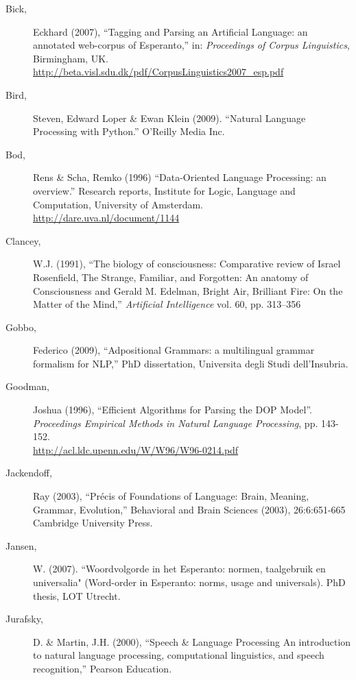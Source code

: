 \documentclass[10pt,a4paper]{article}
\begin{document}
\begin{description}
\item[Bick,] Eckhard (2007), ``Tagging and Parsing an Artificial Language: an
annotated web-corpus of Esperanto,'' in: {\em Proceedings of Corpus
Linguistics}, Birmingham, UK. \\
\url{http://beta.visl.sdu.dk/pdf/CorpusLinguistics2007_esp.pdf}

\item[Bird,] Steven, Edward Loper \& Ewan Klein (2009).
    ``Natural Language Processing with Python.''  O'Reilly Media Inc.

\item[Bod,] Rens \& Scha, Remko (1996) ``Data-Oriented Language Processing: an
overview.'' Research reports, Institute for Logic, Language and Computation,
University of Amsterdam. \\
\url{http://dare.uva.nl/document/1144}

\item[Clancey,] W.J. (1991), ``The biology of consciousness: Comparative review
of Israel Rosenfield, The Strange, Familiar, and Forgotten: An anatomy of
Consciousness and Gerald M. Edelman, Bright Air, Brilliant Fire: On the Matter
of the Mind,'' {\em Artificial Intelligence} vol. 60, pp. 313--356

\item[Gobbo,] Federico (2009), ``Adpositional Grammars: a multilingual grammar
formalism for NLP,'' PhD dissertation, Universita degli Studi dell'Insubria.

\item[Goodman,] Joshua (1996), ``Efficient Algorithms for Parsing the DOP Model''. {\em Proceedings Empirical Methods in Natural Language Processing}, pp. 143-152. \\
\url{http://acl.ldc.upenn.edu/W/W96/W96-0214.pdf}

\item[Jackendoff,] Ray (2003), ``Précis of Foundations of Language: Brain, Meaning,
Grammar, Evolution,'' Behavioral and Brain Sciences (2003), 26:6:651-665
Cambridge University Press.

\item[Jansen,] W. (2007). ``Woordvolgorde in het Esperanto: normen, taalgebruik en
universalia" (Word-order in Esperanto: norms, usage and universals). PhD
thesis, LOT Utrecht.

\item[Jurafsky,] D. \& Martin, J.H. (2000), ``Speech \& Language Processing An
introduction to natural language processing, computational linguistics, and
speech recognition,'' Pearson Education.


\end{description}
\end{document}
